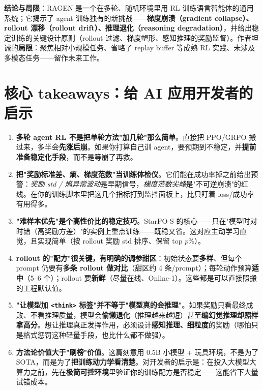 \documentclass[11pt,UTF8,fontset=fandol]{ctexart}
\begin{document}
\textbf{结论与局限}：RAGEN 是一个在多轮、随机环境里用 RL 训练语言智能体的通用系统；它揭示了 agent 训练独有的新挑战——\textbf{梯度崩溃（gradient collapse）、rollout 漂移（rollout drift）、推理退化（reasoning degradation）}，并给出稳定训练的关键设计原则（rollout 过滤、梯度塑形、感知推理的奖励监督）。作者坦诚的\textbf{局限}：聚焦相对小规模任务、省略了 replay buffer 等成熟 RL 实践、未涉及多模态任务——留作未来工作。

\section{核心 takeaways：给 AI 应用开发者的启示}

\begin{enumerate}[leftmargin=1.6em,itemsep=4pt]
\item \textbf{多轮 agent RL 不是把单轮方法"加几轮"那么简单}。直接把 PPO/GRPO 搬过来，多半会\textbf{先涨后崩}。如果你打算自己训 agent，要预期到不稳定，并\textbf{提前准备稳定化手段}，而不是等崩了再救。

\item \textbf{把"奖励标准差、熵、梯度范数"当训练体检仪}。它们能在成功率掉之前给出预警：\emph{奖励 std / 熵异常波动}是早期信号，\emph{梯度范数尖峰}是"不可逆崩溃"的红线。在你的训练脚本里把这几个指标打到监控面板上，比只盯着 loss/成功率有用得多。

\item \textbf{"难样本优先"是个高性价比的稳定技巧}。StarPO-S 的核心——只在"模型时对时错（高奖励方差）"的实例上重点训练——既稳又省。这对应主动学习直觉，且实现简单（按 rollout 奖励 std 排序、保留 top $p\%$）。

\item \textbf{rollout 的"配方"很关键，有明确的调参甜区}：初始状态要\textbf{多样}、但每个 prompt 仍要有\textbf{多条 rollout 做对比}（甜区约 4 条/prompt）；每轮动作预算\textbf{适中}（5--6 个）；rollout 要\textbf{新鲜}（尽量在线、Online-1）。这些都是可以直接照搬的工程默认值。

\item \textbf{"让模型加 \texttt{<think>} 标签"并不等于"模型真的会推理"}。如果奖励只看最终成败、不看推理质量，模型会\textbf{偷懒退化}（推理越来越短）甚至\textbf{编幻觉推理却照样拿高分}。想让推理真正发挥作用，必须设计\textbf{感知推理、细粒度}的奖励（哪怕只是格式惩罚这种轻量手段，也比什么都不做强）。

\item \textbf{方法论价值大于"刷榜"价值}。这篇刻意用 0.5B 小模型 + 玩具环境，不是为了 SOTA，而是为了\textbf{把训练动力学看清楚}。对开发者的启示是：在投入大模型大算力之前，先在\textbf{极简可控环境}里验证你的训练配方是否稳定——这能省下大量试错成本。
\end{enumerate}
\end{document}
